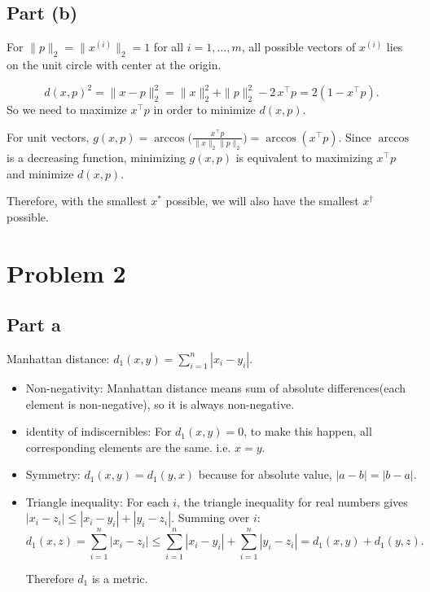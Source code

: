\documentclass{article}
\begin{document}
    \newpage
    \subsection{Part (b)}

    For $\|p\|_2 = \|x^{(i)}\|_2 = 1$ for all $i = 1, \ldots, m$, all possible vectors of $x^{(i)}$ lies on the unit circle with center at the origin.

    \[
        d(x, p)^2 = \|x - p\|_2^2 = \|x\|_2^2 + \|p\|_2^2 - 2\, x^\top p = 2(1 - x^\top p).
    \]
    \medskip
    \noindent So we need to maximize $x^\top p$ in order to minimize $d(x, p)$.

    \noindent For unit vectors, $g(x, p) = \arccos\bigl(\frac{x^\top p}{\|x\|_2\|p\|_2}\bigr) = \arccos(x^\top p)$.\newline
    Since $\arccos$ is a decreasing function, minimizing $g(x, p)$ is equivalent to maximizing $x^\top p$ and minimize $d(x, p)$.

    \medskip
    \noindent Therefore, with the smallest $x^*$ possible, we will also have the smallest $x^\dagger$ possible.

    \section{Problem 2}
    \subsection{Part a}
    Manhattan distance: $d_1(x, y) = \sum_{i=1}^n |x_i - y_i|$.
    \begin{itemize}
        \item Non-negativity: Manhattan distance means sum of absolute differences(each element is non-negative), so it is always non-negative.
        \item identity of indiscernibles: For $d_1(x, y) = 0$, to make this happen, all corresponding elements are the same. i.e. $x = y$.
        \item Symmetry: $d_1(x, y) = d_1(y, x)$ because for absolute value, $|a - b| = |b - a|$.
        \item Triangle inequality: For each $i$, the triangle inequality for real numbers gives $|x_i - z_i| \leq |x_i - y_i| + |y_i - z_i|$. Summing over $i$:
        \[
            d_1(x, z) = \sum_{i=1}^n |x_i - z_i| \leq \sum_{i=1}^n |x_i - y_i| + \sum_{i=1}^n |y_i - z_i| = d_1(x, y) + d_1(y, z).
        \]
    
        Therefore $d_1$ is a metric.%
    \end{itemize}
\end{document}
